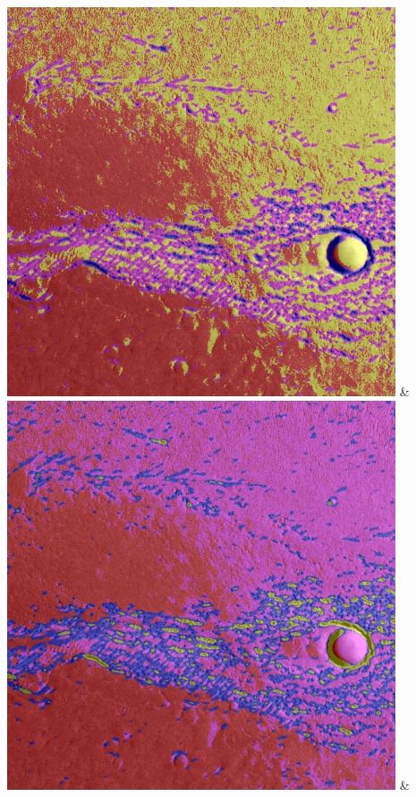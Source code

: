 \begin{table}[h!]
\begin{tabularx}{\textwidth}
		\includegraphics[width=0.9\linewidth]{images/gen/spatial_weight/p03_02.png_0.00.png} &
		\includegraphics[width=0.9\linewidth]{images/gen/spatial_weight/p03_02.png_0.33.png} &

\end{tabularx}
\end{table}
